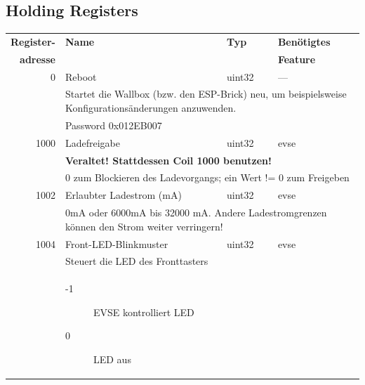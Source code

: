\documentclass[a4paper,10pt]{article}
\newcommand{\tdesc}[1]{\multicolumn{3}{l}{\footnotesize #1}}
\begin{document}
\subsection*{Holding Registers}
\begin{tabularx}{\textwidth}{rXll} \toprule
    \textbf{Register-} & \textbf{Name} & \textbf{Typ} & \textbf{Benötigtes}                                                     \\
    \textbf{adresse}   &      &     & \textbf{Feature}                                                                          \\ \midrule
0             & Reboot                                  & uint32       & ---                                                    \\
              & \tdesc{Startet die Wallbox (bzw. den ESP-Brick) neu, um beispielsweise Konfigurationsänderungen anzuwenden.}    \\
              & \tdesc{Password 0x012EB007}                                                                                     \\ \cmidrule{2-4}
1000          & Ladefreigabe                            & uint32       & evse                                                   \\
              & \tdesc{\textbf{Veraltet! Stattdessen Coil 1000 benutzen!}}                                                      \\
              & \tdesc{0 zum Blockieren des Ladevorgangs; ein Wert != 0 zum Freigeben}                                          \\ \cmidrule{2-4}
1002          & Erlaubter Ladestrom (mA)                & uint32       & evse                                                   \\
              & \tdesc{0mA oder 6000mA bis 32000 mA. Andere Ladestromgrenzen können den Strom weiter verringern!}               \\ \cmidrule{2-4}
1004          & Front-LED-Blinkmuster                   & uint32       & evse                                                   \\
              & \tdesc{Steuert die LED des Fronttasters}                                                                        \\
              & \begin{description}
                    \item[-1] EVSE kontrolliert LED
                    \item[0] LED aus

\end{description}
\end{tabularx}
\end{document}
